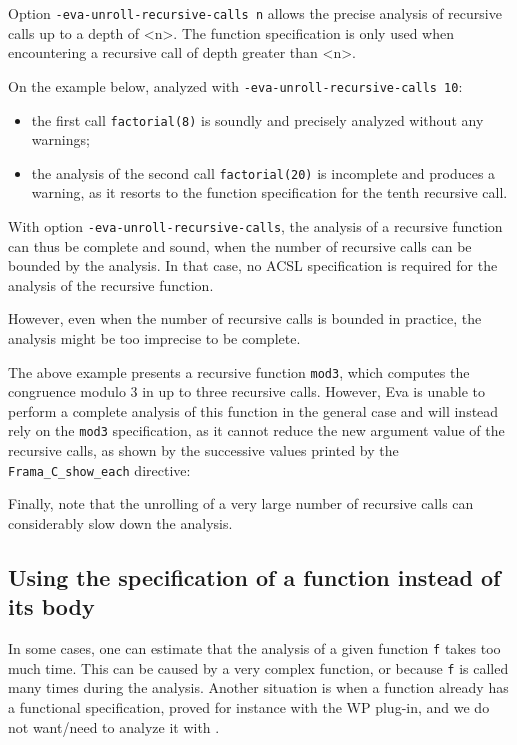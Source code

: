\documentclass{frama-c-book}
\begin{document}
Option \lstinline|-eva-unroll-recursive-calls n| allows the precise analysis
of recursive calls up to a depth of <n>. The function specification is only used
when encountering a recursive call of depth greater than <n>.

On the example below, analyzed with \lstinline|-eva-unroll-recursive-calls 10|:
\begin{itemize}
\item
  the first call \lstinline|factorial(8)| is soundly and precisely analyzed
  without any warnings;
\item
  the analysis of the second call \lstinline|factorial(20)| is incomplete and
  produces a warning, as it resorts to the function specification for the tenth
  recursive call.
\end{itemize}


With option \lstinline|-eva-unroll-recursive-calls|,
the analysis of a recursive function can thus be complete and sound,
when the number of recursive calls can be bounded by the analysis.
In that case, no ACSL specification is required for the analysis of the
recursive function.

However, even when the number of recursive calls is bounded in practice,
the \Eva{} analysis might be too imprecise to be complete.


The above example presents a recursive function \lstinline|mod3|, which
computes the congruence modulo 3 in up to three recursive calls.
However, Eva is unable to perform a complete analysis of this function
in the general case and will instead rely on the \lstinline|mod3| specification,
as it cannot reduce the new argument value of the recursive calls, as shown
by the successive values printed by the \lstinline|Frama_C_show_each| directive:


Finally, note that the unrolling of a very large number of recursive calls can
considerably slow down the analysis.


\subsection{Using the specification of a function instead of its body}
\label{val-use-spec}

In some cases, one can estimate that the analysis of a given function \verb+f+
takes too much time. This can be caused by a very complex
function, or because \verb+f+ is called many times during the analysis.
Another situation is when a function already has a functional specification,
proved for instance with the \textsf{WP} plug-in, and we do not want/need
to analyze it with \Eva{}.
\end{document}
